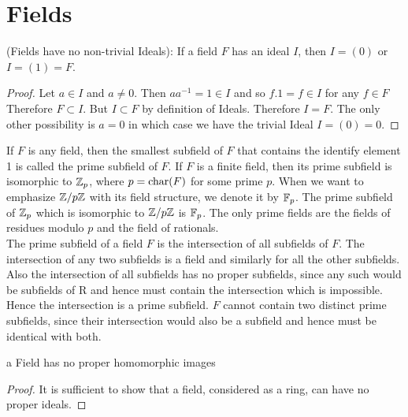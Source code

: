 \section{Fields}

\begin{theorem}{(Fields have no non-trivial Ideals):}
If a field $F$ has an ideal $I$, then $I = (0)$ or $I = (1) = F$. 
\end{theorem}
\begin{proof}
Let $a \in I$ and  $a\ne 0$. Then $a a^{-1} = 1 \in I$ and so $f.1 = f \in I$ for any $f\in F$ Therefore $ F \subset I$. But $I \subset F$ by definition of Ideals. Therefore $ I = F$. The only other possibility is $a=0$ in which case we have the trivial Ideal $ I = (0) = 0$.
\end{proof}

If $F$ is any field, then the smallest subfield of $F$ that contains the identify element 1 is called the {\elevenit prime subfield}\/ of $F$. If $F$ is a finite field, then its prime subfield is isomorphic to $\mathbb{Z}_p$, where $p = \hbox{char}(F)$ for some prime $p$. When we want to emphasize $\mathbb{Z}/p\mathbb{Z}$ with its field structure, we denote it by $\mathbb{F}_p$. The prime subfield of $\mathbb{Z}_p$ which is isomorphic to $\mathbb{Z}/p\mathbb{Z}$ is $\mathbb{F}_p$. The only prime fields are the fields of residues modulo $p$ and the field of rationals.\\

The prime subfield of a field $F$ is the intersection of all subfields of $F$. The intersection of any two subfields is a field and similarly for all the other subfields. Also the intersection of all subfields has no proper subfields, since any such would be subfields of R and hence must contain the intersection which is impossible. Hence the intersection is a prime subfield. $F$ cannot contain two distinct prime subfields, since their intersection would also be a subfield and hence must be identical with both. 

\begin{theorem}
a Field has no proper homomorphic images
\end{theorem}
\begin{proof}
It is sufficient to show that a field, considered as a ring, can have no proper ideals. 
\end{proof}

